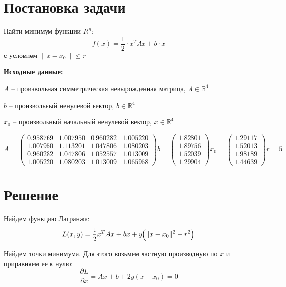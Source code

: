 \documentclass[a4paper, 14pt]{extarticle}
\newenvironment{widerequation}{%
	\begin{adjustwidth}{-2cm}{-2cm}\begin{equation}}
		{\end{equation}\end{adjustwidth}}
\begin{document}
	\pagebreak	

	\section{Постановка задачи}
		Найти минимум функции $R^n$: 
		\[ f(x) = \dfrac{1}{2} \cdot x^TAx + b \cdot x \]
		с условием $\|x - x_0\| \leq r$
		
		\textbf{Исходные данные:}
		
		\hphantom{--}$A$ -- произвольная симметрическая невырожденная матрица, $A \in \mathbb{R}^{4}$
		
		\hphantom{--}$b$	-- произвольный ненулевой вектор, $b \in \mathbb{R}^{4}$ 
		
		\hphantom{--}$x_0$ -- произвольный начальный ненулевой вектор, $ x \in\mathbb{R}^{4} $
		\begin{widerequation}
			A = 
			\begin{pmatrix}
				0.958769 & 1.007950 & 0.960282 & 1.005220\\
				1.007950 & 1.113201 & 1.047806 & 1.080203\\
				0.960282 & 1.047806 & 1.052557 & 1.013009\\
				1.005220 & 1.080203 & 1.013009 & 1.065958
			\end{pmatrix}
			b = 
			\begin{pmatrix} 
				1.82801\\
				1.89756\\
				1.52039\\
				1.29904
			\end{pmatrix}
			x_0 = 
			\begin{pmatrix} 
				1.29117\\
				1.52013\\
				1.98189\\
				1.44639
			\end{pmatrix}	
			r = 5
		\end{widerequation}
 	\section{Решение}
 		Найдем функцию Лагранжа:
 		\[ L(x,y) = \dfrac{1}{2}x^TAx + bx + y\Bigl(\|x-x_0\|^2 - r^2\Bigr) \]	
 		
 		Найдем точки минимума. Для этого возьмем частную производную по $x$ и приравняем ее к нулю:
 		\[ \dfrac{\partial L}{\partial x} = Ax + b + 2y(x - x_0) = 0 \]
 		\pagebreak
 		
\end{document}
